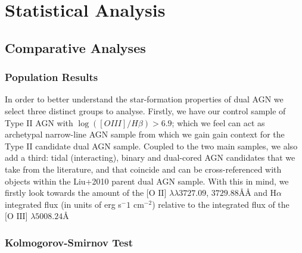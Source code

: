 \section{Statistical Analysis}
\subsection{Comparative Analyses}
\subsubsection{Population Results}

In order to better understand the star-formation properties of dual AGN we select three distinct groups to analyse. Firstly, we have our control sample of Type II AGN with $\log{([O III]/H\beta)}>{6.9}$; which we feel can act as archetypal narrow-line AGN sample from which we gain gain context for the Type II candidate dual AGN sample. Coupled to the two main samples, we also add a third: tidal (interacting), binary and dual-cored AGN candidates that we take from the literature, and that coincide and can be cross-referenced with objects within the Liu+2010 parent dual AGN sample. With this in mind, we firstly look towards the amount of the $\text{[O II]}$ $\lambda\lambda$$3727.09$, $3729.88$\AA\AA{} and $\text{H}\alpha$ integrated flux (in units of erg s${^-1}$ cm$^{-2}$) relative to the integrated flux of the $\text{[O III]}$ $\lambda$$5008.24$\AA{}   

\subsubsection{Kolmogorov-Smirnov Test}


  